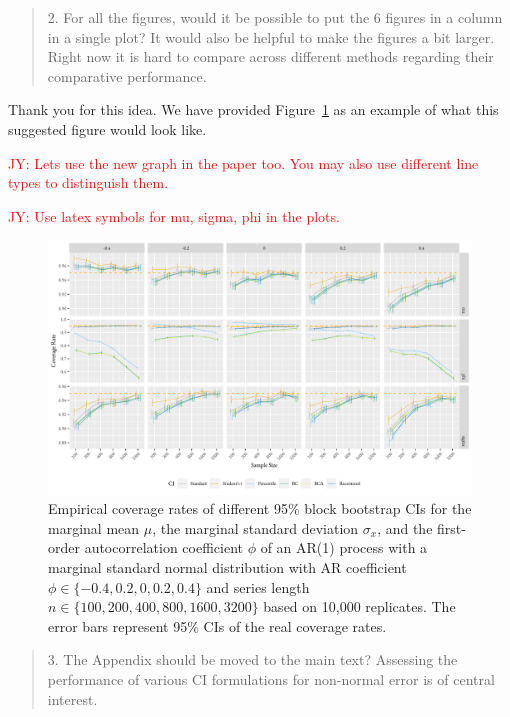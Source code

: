 \documentclass[12pt]{article}
\newcommand{\jy}[1]{\textcolor{red}{JY: #1}}
\newenvironment{comment}%
{\begin{quotation}\noindent\small\it\color{darkblue}\ignorespaces%
}{\end{quotation}}
\begin{document}
\begin{comment}
2. For all the figures, would it be possible to put the 6 figures in a column in 
a single plot? It would also be helpful to make the figures a bit larger. Right 
now it is hard to compare across different methods regarding their comparative 
performance.
\end{comment}


Thank you for this idea. We have provided Figure~\ref{fig:norm1} as an 
example of what this suggested figure
would look like.

\jy{Lets use the new graph in the paper too. You may also use
  different line types to distinguish them.}

\jy{Use latex symbols for mu, sigma, phi in the plots.}

\begin{figure}[tbp]
  \centering
  \includegraphics[width=\textwidth]{figures/alt_plot_norm1}
  \caption{Empirical coverage rates of different 95\% block bootstrap CIs for
    the marginal mean $\mu$, the marginal standard deviation $\sigma_x$, and
    the first-order autocorrelation coefficient $\phi$ of an AR(1) process with 
    a marginal standard 
    normal distribution with AR coefficient
    $\phi \in \{-0.4, 0.2, 0, 0.2, 0.4\}$ and series length
    $n \in \{100, 200, 400, 800, 1600, 3200\}$ based on 10,000 replicates. The
    error bars represent 95\% CIs of the real coverage rates.}
  \label{fig:norm1}
\end{figure}


\begin{comment}
3. The Appendix should be moved to the main text? Assessing the performance of 
various CI formulations for non-normal error is of central interest.
\end{comment} 
\end{document}
